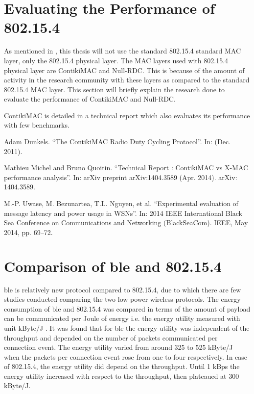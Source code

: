 \section{Evaluating the Performance of 802.15.4} \label{4802}

As mentioned in , this thesis will not use the standard 802.15.4 standard MAC layer, only the 802.15.4 physical layer. The MAC layers used with 802.15.4 physical layer are ContikiMAC and Null-RDC. This is because of the amount of activity in the research community with these layers as compared to the standard 802.15.4 MAC layer. This section will briefly explain the research done to evaluate the performance of ContikiMAC and Null-RDC. 

ContikiMAC is detailed in a technical report \cite{Dunkels2011} which also evaluates its performance with few benchmarks.

\cite{Dunkels2011}
Adam Dunkels. “The ContikiMAC Radio Duty Cycling Protocol”. In: (Dec. 2011).

\cite{Michel2014} Mathieu Michel and Bruno Quoitin. “Technical Report : ContikiMAC vs X-MAC performance analysis”. In: arXiv preprint arXiv:1404.3589 (Apr. 2014). arXiv: 1404.3589.

\cite{Uwase2014} M.-P. Uwase, M. Bezunartea, T.L. Nguyen, et al. “Experimental evaluation of message latency and power usage in WSNs”. In: 2014 IEEE International Black Sea Conference on Communications and Networking (BlackSeaCom). IEEE, May 2014,
pp. 69–72.

\section{Comparison of \texorpdfstring{\gls{ble}}{BLE} and 802.15.4} \label{4ble802}

\gls{ble} is relatively new protocol compared to 802.15.4, due to which there are few studies conducted comparing the two low power wireless protocols. The energy consumption of \gls{ble} and 802.15.4 was compared in terms of the amount of payload can be communicated per Joule of energy i.e. the energy utility measured with unit kByte/J \cite{Siekkinen2012}. It was found that for \gls{ble} the energy utility was independent of the throughput and depended on the number of packets communicated per connection event. The energy utility varied from around 325 to 525 kByte/J when the packets per connection event rose from one to four respectively. In case of 802.15.4, the energy utility did depend on the throughput. Until 1 kBps the energy utility increased with respect to the throughput, then plateaued at 300 kByte/J. 


